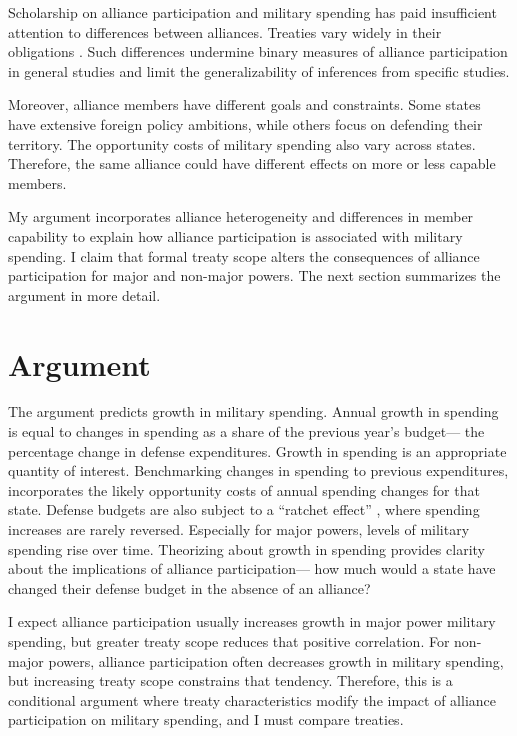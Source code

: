 \documentclass[12pt]{article}
\begin{document}
Scholarship on alliance participation and military spending has paid insufficient attention to differences between alliances.
Treaties vary widely in their obligations \citep{Leedsetal2002}. 
Such differences undermine binary measures of alliance participation in general studies and limit the generalizability of inferences from specific studies. 
 

Moreover, alliance members have different goals and constraints.
Some states have extensive foreign policy ambitions, while others focus on defending their territory. 
The opportunity costs of military spending also vary across states. 
Therefore, the same alliance could have different effects on more or less capable members. 


My argument incorporates alliance heterogeneity and differences in member capability to explain how alliance participation is associated with military spending. 
I claim that formal treaty scope alters the consequences of alliance participation for major and non-major powers. 
The next section summarizes the argument in more detail. 



\section{Argument}

The argument predicts growth in military spending. 
Annual growth in spending is equal to changes in spending as a share of the previous year's budget--- the percentage change in defense expenditures. 
Growth in spending is an appropriate quantity of interest. 
Benchmarking changes in spending to previous expenditures, incorporates the likely opportunity costs of annual spending changes for that state. 
Defense budgets are also subject to a ``ratchet effect'' \cite{Zielinskietal2017}, where spending increases are rarely reversed.
Especially for major powers, levels of military spending rise over time. 
Theorizing about growth in spending provides clarity about the implications of alliance participation--- how much would a state have changed their defense budget in the absence of an alliance? 


I expect alliance participation usually increases growth in major power military spending, but greater treaty scope reduces that positive correlation. 
For non-major powers, alliance participation often decreases growth in military spending, but increasing treaty scope constrains that tendency. 
Therefore, this is a conditional argument where treaty characteristics modify the impact of alliance participation on military spending, and I must compare treaties. 
\end{document}
